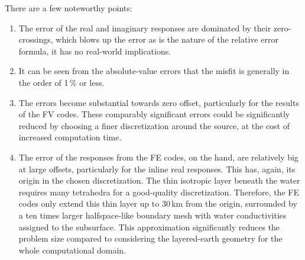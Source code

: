 \documentclass[onecolumn,extra,camera]{gji}
\begin{document}
There are a few noteworthy points:
\begin{enumerate}
  \item The error of the real and imaginary responses are dominated by their zero-crossings, which blows up the error as is the nature of the relative error formula, it has no real-world implications.
  \item It can be seen from the absolute-value errors that the misfit is generally in the order of 1\,\% or less.
  \item The errors become substantial towards zero offset, particularly for the results of the FV codes. These comparably significant errors could be significantly reduced by choosing a finer discretization around the source, at the cost of increased computation time.
  \item The error of the responses from the FE codes, on the hand, are relatively big at large offsets, particularly for the inline real responses. This has, again, its origin in the chosen discretization. The thin isotropic layer beneath the water requires many tetrahedra for a good-quality discretization. Therefore, the FE codes only extend this thin layer up to 30\,km from the origin, surrounded by a ten times larger halfspace-like boundary mesh with water conductivities assigned to the subsurface. This approximation significantly reduces the problem size compared to considering the layered-earth geometry for the whole computational domain.
\end{enumerate}
\end{document}
